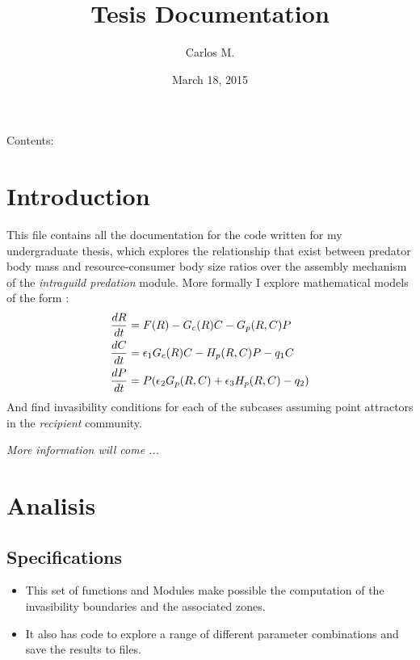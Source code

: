 \documentclass[letterpaper,10pt,english]{sphinxmanual}
\title{Tesis Documentation}
\date{March 18, 2015}
\author{Carlos M.}
\begin{document}
\maketitle
\tableofcontents
{}\label{index::doc}


Contents:


\chapter{Introduction}
\label{Introduction:introduction}\label{Introduction::doc}\label{Introduction:welcome-to-tesis-s-documentation}
This file contains all the documentation for the code written for my undergraduate thesis, which explores the relationship that exist between predator body mass and resource-consumer body size ratios over the assembly mechanism of the \emph{intraguild predation} module.
More formally I explore mathematical models of the form :
\begin{gather}
\begin{split}\frac{dR}{dt} &= F(R) - G_c(R)C - G_p(R,C)P \\
\frac{dC}{dt} &= \epsilon_1G_c(R)C - H_p(R,C)P - q_1C \\
\frac{dP}{dt} &= P(\epsilon_2G_p(R,C) + \epsilon_3 H_p(R,C) - q_2)\end{split}\notag
\end{gather}
And find invasibility conditions for each of the subcases assuming point attractors in the \emph{recipient} community.

\emph{More information will come ...}


\chapter{Analisis}
\label{Analisis/modules::doc}\label{Analisis/modules:analisis}

\section{Specifications}
\label{Analisis/modules:specifications}\begin{itemize}
\item {} 
This set of functions and Modules make possible the computation of the invasibility boundaries and the associated zones.

\item {} 
It also has code to explore a range of different parameter combinations and save the results to files.

\end{itemize}
\end{document}
